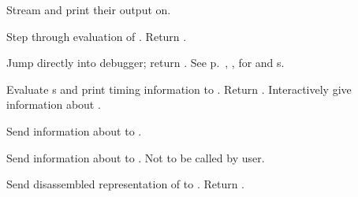 \begin{LIST}{1cm}
  {
  Stream  and  print their output on.
  }

  {
  Step through evaluation of . Return . 
  }

  {
  Jump directly into debugger; return \retval{\NIL}.
  See p.\ \pageref{section:Format}, , for 
  and s. 
  }

  {
  Evaluate s and print timing information to
  . Return . 
  }
  {
    Interactively give information about .
  }

  {
  Send information about  to .
  }

  {
  Send information about  to . Not to be
  called by user.
  }

  {
  Send disassembled representation of  to
  . Return \retval{\NIL}.
  }

\end{LIST}


